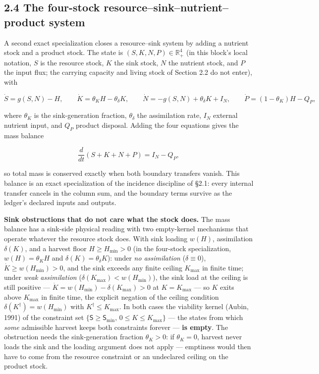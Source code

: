 \documentclass[11pt]{article}
\begin{document}
\subsection*{2.4 The four-stock resource--sink--nutrient--product system}\label{24-the-four-stock-resource--sink--nutrient--product-system}

A second exact specialization closes a resource--sink system by adding a nutrient stock and a product stock. The state is \((S,\allowbreak{} K,\allowbreak{} N,\allowbreak{} P) \in \mathbb{R}^4_+\allowbreak{}\) (in this block's local notation, \(S\) is the resource stock, \(K\) the sink stock, \(N\) the nutrient stock, and \(P\) the input flux; the carrying capacity and living stock of Section 2.2 do not enter), with 

$$\dot S = g(S,N) - H, \qquad \dot K = \theta_K H - \theta_\delta K, \qquad \dot N = -g(S,N) + \theta_\delta K + I_N, \qquad \dot P = (1 - \theta_K)H - Q_P,$$

 where \(\theta_K\) is the sink-generation fraction, \(\theta_\delta\) the assimilation rate, \(I_N\) external nutrient input, and \(Q_P\) product disposal. Adding the four equations gives the mass balance 

$$\frac{d}{dt}(S + K + N + P) = I_N - Q_P,$$

 so total mass is conserved exactly when both boundary transfers vanish. This balance is an exact specialization of the incidence discipline of \S2.1: every internal transfer cancels in the column sum, and the boundary terms survive as the ledger's declared inputs and outputs.

\textbf{Sink obstructions that do not care what the stock does.} The mass balance has a sink-side physical reading with two empty-kernel mechanisms that operate whatever the resource stock does. With sink loading \(w(H)\), assimilation \(\delta(K)\), and a harvest floor \(H \ge H_{\min} > 0\) (in the four-stock specialization, \(w(H) = \theta_K H\) and \(\delta(K) = \theta_\delta K\)): under \emph{no assimilation} (\(\delta \equiv 0\)), \(\dot K \ge w(H_{\min}) > 0\), and the sink exceeds any finite ceiling \(K_{\max}\) in finite time; under \emph{weak assimilation} (\(\delta(K_{\max}) < w(H_{\min})\)), the sink load at the ceiling is still positive --- \(\dot K =\allowbreak{} w(H_{\min}) - \delta(K_{\max}) > 0\) at \(K = K_{\max}\) --- so \(K\) exits above \(K_{\max}\) in finite time, the explicit negation of the ceiling condition \(\delta(K^\dagger) =\allowbreak{} w(H_{\min})\) with \(K^\dagger \le K_{\max}\). In both cases the viability kernel (Aubin, 1991) of the constraint set \(\{\mathsf S\ge \mathsf S_{\min},\allowbreak{}\,\allowbreak{}0\le K\le K_{\max}\}\) --- the states from which \emph{some} admissible harvest keeps both constraints forever --- \textbf{is empty}. The obstruction needs the sink-generation fraction \(\theta_K > 0\): if \(\theta_K = 0\), harvest never loads the sink and the loading argument does not apply --- emptiness would then have to come from the resource constraint or an undeclared ceiling on the product stock.
\end{document}
